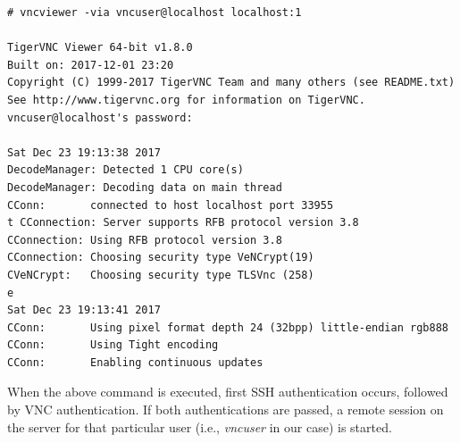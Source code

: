 \vspace{-15pt}
\begin{verbatim}
# vncviewer -via vncuser@localhost localhost:1

TigerVNC Viewer 64-bit v1.8.0
Built on: 2017-12-01 23:20
Copyright (C) 1999-2017 TigerVNC Team and many others (see README.txt)
See http://www.tigervnc.org for information on TigerVNC.
vncuser@localhost's password: 

Sat Dec 23 19:13:38 2017
DecodeManager: Detected 1 CPU core(s)
DecodeManager: Decoding data on main thread
CConn:       connected to host localhost port 33955
t CConnection: Server supports RFB protocol version 3.8
CConnection: Using RFB protocol version 3.8
CConnection: Choosing security type VeNCrypt(19)
CVeNCrypt:   Choosing security type TLSVnc (258)
e
Sat Dec 23 19:13:41 2017
CConn:       Using pixel format depth 24 (32bpp) little-endian rgb888
CConn:       Using Tight encoding
CConn:       Enabling continuous updates
\end{verbatim}
\vspace{-10pt}

\noindent
When the above command is executed, first SSH authentication occurs, followed by VNC authentication. If both authentications are passed, a remote session on the server for that particular user (i.e., \textit{vncuser} in our case) is started. 